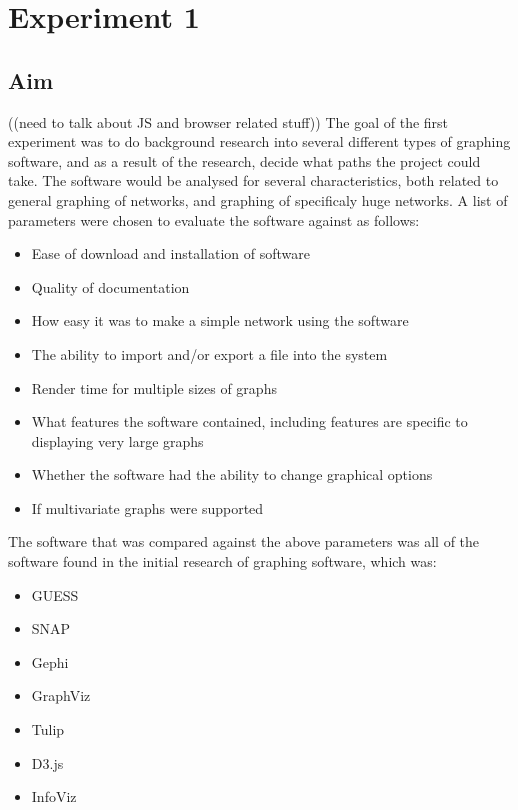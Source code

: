 

\chapter{Experiment 1}


\section{Aim} 
((need to talk about JS and browser related stuff))
The goal of the first experiment was to do background research into several different types of graphing software, and as a result of the research, decide what paths the project could take. The software would be analysed for several characteristics, both related to general graphing of networks, and graphing of specificaly huge networks. A list of parameters were chosen to evaluate the software against as follows:
\begin{itemize}
	\item Ease of download and installation of software
	\item Quality of documentation 
	\item How easy it was to make a simple network using the software
	\item The ability to import and/or export a file into the system
	\item Render time for multiple sizes of graphs
	\item What features the software contained, including features are specific to displaying very large graphs
	\item Whether the software had the ability to change graphical options
	\item If multivariate graphs were supported
\end{itemize}

The software that was compared against the above parameters was all of the software found in the initial research of graphing software, which was:
\begin{itemize}
	\item GUESS
	\item SNAP
	\item Gephi
	\item GraphViz
	\item Tulip
	\item D3.js
	\item InfoViz
\end{itemize}

